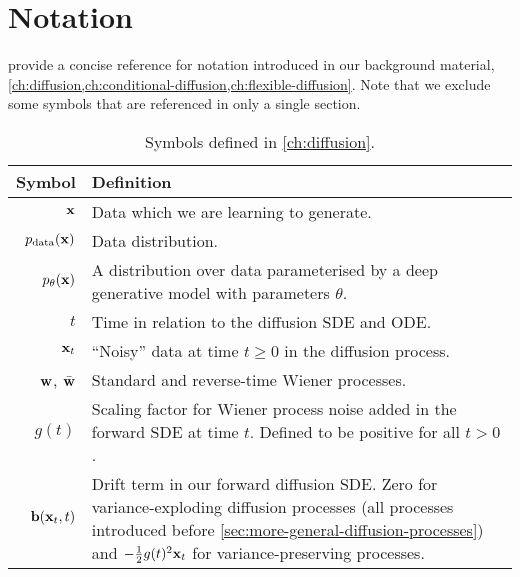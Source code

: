 \chapter{Notation}

 provide a concise reference for notation introduced in our background material, \cref{ch:diffusion,ch:conditional-diffusion,ch:flexible-diffusion}. Note that we exclude some symbols that are referenced in only a single section.

\begin{table*}
  \caption{Symbols defined in \cref{ch:diffusion}. 
  }
  \label{tab:diffusion-notation-appendix}
  \centering
  \footnotesize
  \begin{tabular}{rp{9cm}}
    \toprule
    Symbol    & Definition   \\
    \midrule
    ${\mathbf{x}}$                                  & Data which we are learning to generate. \\ %
    $p_{\rm{data}}({\mathbf{x}})$                          & Data distribution. \\
    $p_\theta({\mathbf{x}})$                        & A distribution over data parameterised by a deep generative model with parameters $\theta$. \\
    $t$                                     & Time in relation to the diffusion SDE and ODE.  \\
    ${\mathbf{x}}_t$                                & ``Noisy'' data at time $t \geq 0$ in the diffusion process.  \\
    ${\mathbf{w}}$, $\bar{{\mathbf{w}}}$                    & Standard and reverse-time Wiener processes. \\
    $g(t)$                                  & Scaling factor for Wiener process noise added in the forward SDE at time $t$. Defined to be positive for all $t > 0$. \\
    ${\mathbf{b}}({\mathbf{x}}_t, t)$                       & Drift term in our forward diffusion SDE. Zero for variance-exploding diffusion processes (all processes introduced before \cref{sec:more-general-diffusion-processes}) and $-\frac{1}{2}g(t)^2 {\mathbf{x}}_t$ for variance-preserving processes. \\

\end{tabular}
\end{table*}
